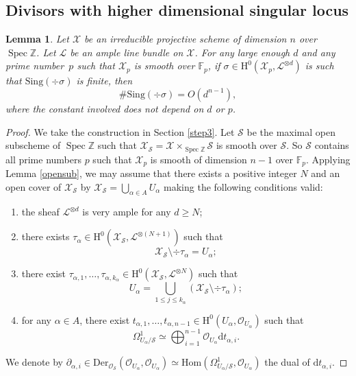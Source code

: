 \documentclass[11pt]{article}
\newcommand{\Subsection}{\subsection}
\numberwithin{equation}{section}
\theoremstyle{plain}
\newtheorem{lem}[thm]{Lemma}
\theoremstyle{definition}
\newcommand{\ho}{\mathrm{H}}
\newcommand{\X}{\mathcal{X}}
\newcommand{\li}{\mathcal{L}}
\newcommand{\Z}{\mathbb{Z}}
\newcommand{\F}{\mathbb{F}}
\DeclareMathOperator{\Spec}{Spec}
\begin{document}
\Subsection{Divisors with higher dimensional singular locus}

\begin{lem}\label{singnum}
Let $\X$ be an irreducible projective scheme of dimension $n$ over $\Spec \Z$. Let $\li$ be an ample line bundle on $\X$. For any large enough $d$ and any prime number~$p$ such that $\X_p$ is smooth over $\F_p$, if $\sigma\in \ho^0(\X_p, \li^{\otimes d})$ is such that $\mathrm{Sing}(\div \sigma)$ is finite, then
\[
\#\mathrm{Sing}(\div \sigma)=O(d^{n-1}),
\]
where the constant involved does not depend on $d$ or $p$.
\end{lem}

\begin{proof}
We take the construction in Section \ref{step3}. Let $\mathcal{S}$ be the maximal open subscheme of $\Spec \Z$ such that $\X_{\mathcal{S}}=\X\times_{\Spec \Z}\mathcal{S}$ is smooth over $\mathcal{S}$. So $\mathcal{S}$ contains all prime numbers $p$ such that $\X_p$ is smooth of dimension $n-1$ over $\F_p$. Applying Lemma \ref{opensub}, we may assume that there exists a positive integer $N$ and an open cover of $\X_{\mathcal{S}}$ by $\X_{\mathcal{S}}=\bigcup_{ \alpha\in A}U_{\alpha}$ making the following conditions valid:
\begin{enumerate}
\item the sheaf $\li^{\otimes d}$ is very ample for any $d\geq N$;
\item there exists $\tau_{\alpha}\in \ho^0(\X_{\mathcal{S}}, \li^{\otimes (N+1)})$ such that
\[
\X_{\mathcal{S}}\setminus\div \tau_{\alpha}=U_{\alpha};
\]
\item there exist $\tau_{\alpha,1},\dots, \tau_{\alpha,k_{\alpha}}\in \ho^0(\X_{\mathcal{S}}, \li^{\otimes N})$ such that
\[
U_{\alpha}=\bigcup_{1\leq j\leq k_{\alpha}}(\X_{\mathcal{S}}\setminus \div \tau_{\alpha});
\]
\item for any $\alpha\in A$, there exist $t_{\alpha, 1},\dots,t_{\alpha, n-1}\in \ho^0(U_{\alpha}, \mathcal{O}_{U_{\alpha}})$ such that
\[
\Omega^1_{U_{\alpha}/\mathcal{S}}\simeq \bigoplus_{i=1}^{n-1}\mathcal{O}_{U_{\alpha}}\mathrm{d}t_{\alpha,i}.
\]
\end{enumerate}
We denote by $\partial_{\alpha,i}\in \mathrm{Der}_{\mathcal{O}_{\mathcal{S}}}(\mathcal{O}_{U_{\alpha}},\mathcal{O}_{U_{\alpha}})\simeq \mathrm{Hom}(\Omega^1_{U_{\alpha}/\mathcal{S}}, \mathcal{O}_{U_{\alpha}})$ the dual of $\mathrm{d}t_{\alpha, i}$.


\end{proof}
\end{document}
